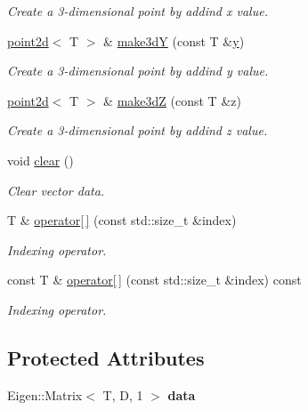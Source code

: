 \begin{DoxyCompactItemize}
\begin{DoxyCompactList}\small\item\em Create a 3-\/dimensional point by addind x value. \end{DoxyCompactList}\item 
\hyperlink{classacme_1_1point2d}{point2d}$<$ T $>$ \& \hyperlink{classacme_1_1point2d_ac6bdbcec56da64ea0265691f3e734625}{make3dY} (const T \&\hyperlink{classacme_1_1point2d_adf79b9f2fbcac2c5f1bea2bece0e9b27}{y})
\begin{DoxyCompactList}\small\item\em Create a 3-\/dimensional point by addind y value. \end{DoxyCompactList}\item 
\hyperlink{classacme_1_1point2d}{point2d}$<$ T $>$ \& \hyperlink{classacme_1_1point2d_a605f4d335747c08026316ec4982b7eb5}{make3dZ} (const T \&z)
\begin{DoxyCompactList}\small\item\em Create a 3-\/dimensional point by addind z value. \end{DoxyCompactList}\item 
\mbox{\label{classacme_1_1pointnd_a2d0b84e609dc1ad5cbbe631c5bb5791f}} 
void \hyperlink{classacme_1_1pointnd_a2d0b84e609dc1ad5cbbe631c5bb5791f}{clear} ()
\begin{DoxyCompactList}\small\item\em Clear vector data. \end{DoxyCompactList}\item 
T \& \hyperlink{classacme_1_1pointnd_a35b0691673728d98d455c007612d6b91}{operator\mbox{[}$\,$\mbox{]}} (const std\+::size\+\_\+t \&index)
\begin{DoxyCompactList}\small\item\em Indexing operator. \end{DoxyCompactList}\item 
const T \& \hyperlink{classacme_1_1pointnd_a565e9ed195c8f8dadc570a029a3deb94}{operator\mbox{[}$\,$\mbox{]}} (const std\+::size\+\_\+t \&index) const
\begin{DoxyCompactList}\small\item\em Indexing operator. \end{DoxyCompactList}\end{DoxyCompactItemize}
\subsection*{Protected Attributes}
\begin{DoxyCompactItemize}
\item 
\mbox{\label{classacme_1_1pointnd_a13b19080ed617e2a9c5d6058f07d4f4b}} 
Eigen\+::\+Matrix$<$ T, D, 1 $>$ {\bfseries data}
\end{DoxyCompactItemize}


